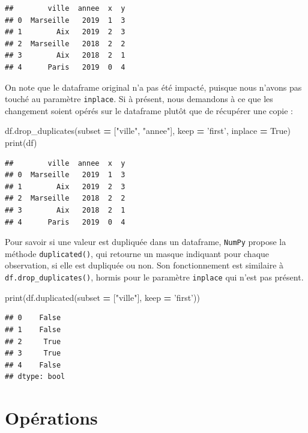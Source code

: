 \documentclass[12pt,]{book}
\newenvironment{Shaded}{\begin{snugshade}}{\end{snugshade}}
\newcommand{\StringTok}[1]{\textcolor[rgb]{0.31,0.60,0.02}{#1}}
\newcommand{\VariableTok}[1]{\textcolor[rgb]{0.00,0.00,0.00}{#1}}
\newcommand{\OperatorTok}[1]{\textcolor[rgb]{0.81,0.36,0.00}{\textbf{#1}}}
\newcommand{\BuiltInTok}[1]{#1}
\newcommand{\NormalTok}[1]{#1}
\numberwithin{equation}{section}
\numberwithin{countremarque}{section}
\begin{document}
\begin{lstlisting}
##        ville  annee  x  y
## 0  Marseille   2019  1  3
## 1        Aix   2019  2  3
## 2  Marseille   2018  2  2
## 3        Aix   2018  2  1
## 4      Paris   2019  0  4
\end{lstlisting}

On note que le dataframe original n'a pas été impacté, puisque nous
n'avons pas touché au paramètre \texttt{inplace}. Si à présent, nous
demandons à ce que les changement soient opérés sur le dataframe plutôt
que de récupérer une copie :

\begin{Shaded}
\begin{Highlighting}[]
\NormalTok{df.drop_duplicates(subset }\OperatorTok{=}\NormalTok{ [}\StringTok{"ville"}\NormalTok{, }\StringTok{"annee"}\NormalTok{], keep }\OperatorTok{=} \StringTok{'first'}\NormalTok{, inplace }\OperatorTok{=} \VariableTok{True}\NormalTok{)}
\BuiltInTok{print}\NormalTok{(df)}
\end{Highlighting}
\end{Shaded}

\begin{lstlisting}
##        ville  annee  x  y
## 0  Marseille   2019  1  3
## 1        Aix   2019  2  3
## 2  Marseille   2018  2  2
## 3        Aix   2018  2  1
## 4      Paris   2019  0  4
\end{lstlisting}

Pour savoir si une valeur est dupliquée dans un dataframe,
\texttt{NumPy} propose la méthode \texttt{duplicated()}, qui retourne un
masque indiquant pour chaque observation, si elle est dupliquée ou non.
Son fonctionnement est similaire à \texttt{df.drop\_duplicates()},
hormis pour le paramètre \texttt{inplace} qui n'est pas présent.

\begin{Shaded}
\begin{Highlighting}[]
\BuiltInTok{print}\NormalTok{(df.duplicated(subset }\OperatorTok{=}\NormalTok{ [}\StringTok{"ville"}\NormalTok{], keep }\OperatorTok{=} \StringTok{'first'}\NormalTok{))}
\end{Highlighting}
\end{Shaded}

\begin{lstlisting}
## 0    False
## 1    False
## 2     True
## 3     True
## 4    False
## dtype: bool
\end{lstlisting}

\section{Opérations}\label{operations}
\end{document}
